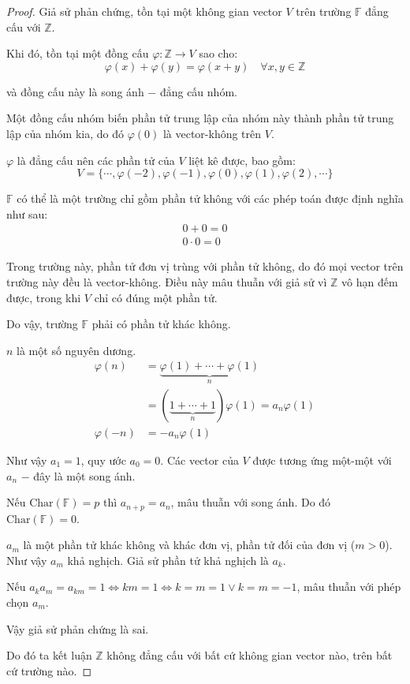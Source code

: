 \documentclass[class=linearalgebra,crop=false]{standalone}
\begin{document}
\begin{proof}Giả sử phản chứng, tồn tại một không gian vector $V$ trên trường $\mathbb{F}$ đẳng cấu với $\mathbb{Z}$.
    \par Khi đó, tồn tại một đồng cấu $\varphi: \mathbb{Z}\rightarrow V$ sao cho:
    \[ \varphi(x) + \varphi(y) = \varphi(x + y)\quad\forall x, y\in\mathbb{Z} \]
    \par và đồng cấu này là song ánh $-$ đẳng cấu nhóm.
    \par Một đồng cấu nhóm biến phần tử trung lập của nhóm này thành phần tử trung lập của nhóm kia, do đó $\varphi(0)$ là vector-không trên $V$.
    \par $\varphi$ là đẳng cấu nên các phần tử của $V$ liệt kê được, bao gồm:
    \[ V = \{ \cdots, \varphi(-2), \varphi(-1), \varphi(0), \varphi(1), \varphi(2), \cdots \} \]
    \par $\mathbb{F}$ có thể là một trường chỉ gồm phần tử không với các phép toán được định nghĩa như sau:
    \begin{align*}
        0 + 0 = 0 \\
        0\cdot 0 = 0
    \end{align*}
    \par Trong trường này, phần tử đơn vị trùng với phần tử không, do đó mọi vector trên trường này đều là vector-không. Điều này mâu thuẫn với giả sử vì $\mathbb{Z}$ vô hạn đếm được, trong khi $V$ chỉ có đúng một phần tử.
    \par Do vậy, trường $\mathbb{F}$ phải có phần tử khác không.
    \par $n$ là một số nguyên dương.
    \begin{align*}
        \varphi(n)  & =\underbrace{\varphi(1) + \cdots + \varphi(1)}_{n}            \\
                    & =(\underbrace{1 + \cdots + 1}_{n})\varphi(1) =a_{n}\varphi(1) \\
        \varphi(-n) & =-a_{n}\varphi(1)
    \end{align*}
    \par Như vậy $a_{1} = 1$, quy ước $a_{0} = 0$. Các vector của $V$ được tương ứng một-một với $a_{n}$ $-$ đây là một song ánh.
    \par Nếu $\text{Char}(\mathbb{F}) = p$ thì $a_{n + p} = a_{n}$, mâu thuẫn với song ánh. Do đó $\text{Char}(\mathbb{F}) = 0$.
    \par $a_{m}$ là một phần tử khác không và khác đơn vị, phần tử đối của đơn vị ($m > 0$). Như vậy $a_{m}$ khả nghịch. Giả sử phần tử khả nghịch là $a_{k}$.
    \par Nếu $a_{k}a_{m} = a_{km} = 1 \Leftrightarrow km = 1 \Leftrightarrow k = m = 1 \vee k = m = -1$, mâu thuẫn với phép chọn $a_{m}$.
    \par Vậy giả sử phản chứng là sai.
    \par Do đó ta kết luận $\mathbb{Z}$ không đẳng cấu với bất cứ không gian vector nào, trên bất cứ trường nào.
\end{proof}
\end{document}
